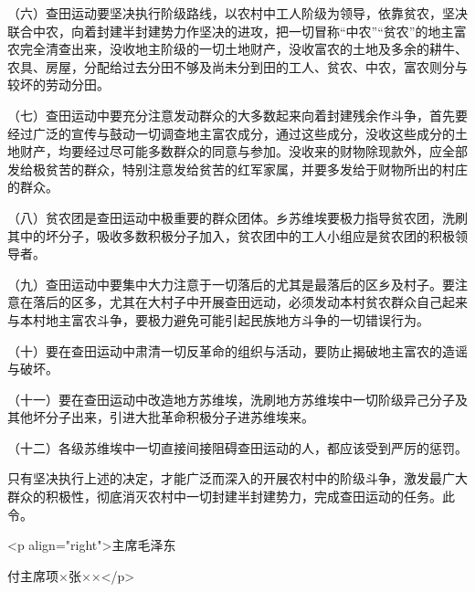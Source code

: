 （六）查田运动要坚决执行阶级路线，以农村中工人阶级为领导，依靠贫农，坚决联合中农，向着封建半封建势力作坚决的进攻，把一切冒称“中农”“贫农”的地主富农完全清查出来，没收地主阶级的一切土地财产，没收富农的土地及多余的耕牛、农具、房屋，分配给过去分田不够及尚未分到田的工人、贫农、中农，富农则分与较坏的劳动分田。

（七）查田运动中要充分注意发动群众的大多数起来向着封建残余作斗争，首先要经过广泛的宣传与鼓动一切调查地主富农成分，通过这些成分，没收这些成分的土地财产，均要经过尽可能多数群众的同意与参加。没收来的财物除现款外，应全部发给极贫苦的群众，特别注意发给贫苦的红军家属，并要多发给于财物所出的村庄的群众。

（八）贫农团是查田运动中极重要的群众团体。乡苏维埃要极力指导贫农团，洗刷其中的坏分子，吸收多数积极分子加入，贫农团中的工人小组应是贫农团的积极领导者。

（九）查田运动中要集中大力注意于一切落后的尤其是最落后的区乡及村子。要注意在落后的区多，尤其在大村子中开展查田远动，必须发动本村贫农群众自己起来与本村地主富农斗争，要极力避免可能引起民族地方斗争的一切错误行为。

（十）要在查田运动中肃清一切反革命的组织与活动，要防止揭破地主富农的造谣与破坏。

（十一）要在查田运动中改造地方苏维埃，洗刷地方苏维埃中一切阶级异己分子及其他坏分子出来，引进大批革命积极分子进苏维埃来。

（十二）各级苏维埃中一切直接间接阻碍查田运动的人，都应该受到严厉的惩罚。

只有坚决执行上述的决定，才能广泛而深入的开展农村中的阶级斗争，激发最广大群众的积极性，彻底消灭农村中一切封建半封建势力，完成查田运动的任务。此令。

<p align="right">主席毛泽东

付主席项×张××</p>

